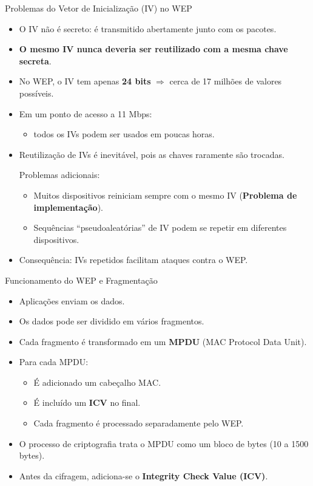 \begin{frame}{Problemas do Vetor de Inicialização (IV) no WEP}
    \begin{itemize}
        \item O IV não é secreto: é transmitido abertamente junto com os pacotes.  
        \item \textbf{O mesmo IV nunca deveria ser reutilizado com a mesma chave secreta}.  
        \item No WEP, o IV tem apenas \textbf{24 bits} $\Rightarrow$ cerca de 17 milhões de valores possíveis.  
        \item Em um ponto de acesso a 11 Mbps:
        \begin{itemize}
            \item todos os IVs podem ser usados em poucas horas.  
        \end{itemize}
        \item Reutilização de IVs é inevitável, pois as chaves raramente são trocadas.  
        \begin{block}{Problemas adicionais:}
            \begin{itemize}
            \item Muitos dispositivos reiniciam sempre com o mesmo IV (\textbf{Problema de implementação}).  
            \item Sequências “pseudoaleatórias” de IV podem se repetir em diferentes dispositivos.  
        \end{itemize}
        \end{block} 
        
        \item Consequência: IVs repetidos facilitam ataques contra o WEP.  
    \end{itemize}
\end{frame}

\begin{frame}{Funcionamento do WEP e Fragmentação}
    \begin{itemize}
        \item Aplicações enviam os dados.
        \item Os dados pode ser dividido em vários fragmentos.
        \item Cada fragmento é transformado em um \textbf{MPDU} (MAC Protocol Data Unit). 
        \item Para cada MPDU:
        \begin{itemize}
            \item É adicionado um cabeçalho MAC.
            \item É incluído um \textbf{ICV} no final.
            \item Cada fragmento é processado separadamente pelo WEP.
        \end{itemize}
        \item O processo de criptografia trata o MPDU como um bloco de bytes (10 a 1500 bytes).
        \item Antes da cifragem, adiciona-se o \textbf{Integrity Check Value (ICV)}.
    \end{itemize}
\end{frame}

